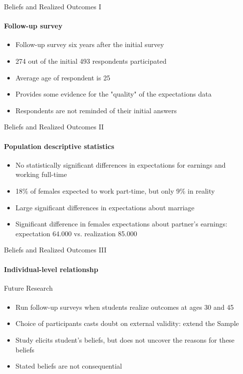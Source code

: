 \documentclass[12pt]{beamer}
\begin{document}
\begin{frame}{Beliefs and Realized Outcomes I}
    \framesubtitle{Follow-up survey}
    \begin{itemize}
        \item Follow-up survey six years after the initial survey
        \item 274 out of the initial 493 respondents participated
        \item Average age of respondent is 25
        \item Provides some evidence for the "quality" of the expectations data
        \item Respondents are not reminded of their initial answers
    \end{itemize}
    
\end{frame}

\begin{frame}{Beliefs and Realized Outcomes II}
    \framesubtitle{Population descriptive statistics}
    \begin{itemize}
        \item No statistically significant differences in expectations for earnings and working full-time
        \item 18\% of females expected to work part-time, but only 9\% in reality
        \item Large significant differences in expectations about marriage
        \item Significant difference in females expectations about partner's earnings: expectation 64.000 vs. realization 85.000
    \end{itemize}
\end{frame}

\begin{frame}{Beliefs and Realized Outcomes III}
    \framesubtitle{Individual-level relationshp}
\end{frame}

\begin{frame}{Future Research}
    \framesubtitle{} 
    \begin{itemize}
        \item Run follow-up surveys when students realize outcomes at ages 30 and 45
        \item Choice of participants casts doubt on external validity: extend the Sample
        \item Study elicits student's beliefs, but does not uncover the reasons for these beliefs
        \item Stated beliefs are not consequential
    \end{itemize}
\end{frame}
\end{document}
